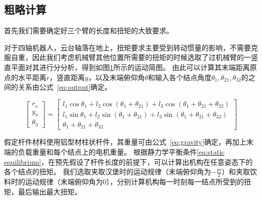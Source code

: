 
    \subsection{粗略计算}

    首先我们需要确定好三个臂的长度和扭矩的大致要求。

    对于四轴机器人，云台轴落在地上，扭矩要求主要受到转动惯量的影响，不需要克服自重，因此我们考虑机械臂其他位置所需要的扭矩的时候选取了过机械臂的一竖直平面对其进行分分析，得到如图\ref{fig:robot_motion}所示的运动简图。
    由此可以计算其末端距离原点的水平距离$r$，竖直距离$y$，以及末端俯仰角$\theta$和输入各个结点角度$\theta_{1}, \theta_{21}, \theta_{32}$的之间的关系由公式~\ref{eq:output}确定。

    \begin{figure}[!htp]
        \centering
        \resizebox{\textwidth}{!}{}
        \label{fig:robot_motion}
    \end{figure}

    \begin{equation}
    \label{eq:output}
    \begin{bmatrix}
    r_o \\
    y_o \\ 
    \theta_3
    \end{bmatrix}
    =
    \begin{bmatrix}
    l_1 \cos{\theta_1} + l_2 \cos(\theta_1 +\theta_{21}) + l_3 \cos(\theta_1 + \theta_{21} + \theta_{32}) \\
    l_1 \sin{\theta_1} + l_2 \sin(\theta_1 + \theta_{21}) + l_3 \sin(\theta_1 +\theta_{21} + \theta_{32}) \\
    \theta_1 + \theta_{21} + \theta_{32}
    \end{bmatrix}
    \end{equation}

    假定杆件材料使用铝型材柱状杆件，其重量可由公式~\ref{eq:gravity}确定，再加上末端的负载重量和每个结点上的电机重量。
    根据静力学平衡条件\ref{eq:static equilibrium}，在预先假设了杆件长度的前提下，可以计算出机构在任意姿态下的各个结点的扭矩。
    我们选取夹取汉堡时的运动规律（末端俯仰角为$-\frac{pi}{2}$）和夹取饮料时的运动规律（末端俯仰角为$0$），分别计算机构每一时刻每一结点所受到的扭矩，最后输出最大扭矩。

